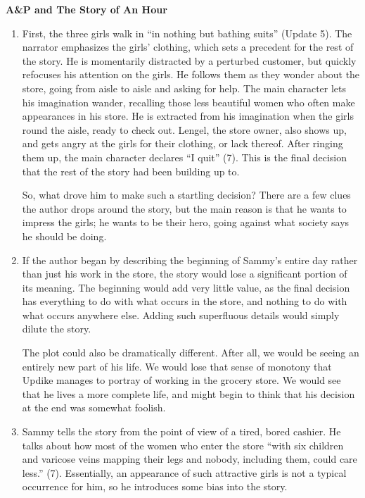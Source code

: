 \documentclass[12pt,letterpaper]{article}
\begin{document}
{\center\textbf{A\&P and The Story of An Hour} \\}

\begin{enumerate}

\item First, the three girls walk in ``in nothing but bathing suits'' (Update
5).  The narrator emphasizes the girls' clothing, which sets a precedent for the
rest of the story.  He is momentarily distracted by a perturbed customer, but
quickly refocuses his attention on the girls.  He follows them as they wonder
about the store, going from aisle to aisle and asking for help.  The main
character lets his imagination wander, recalling those less beautiful women who
often make appearances in his store.  He is extracted from his imagination when
the girls round the aisle, ready to check out.  Lengel, the store owner, also
shows up, and gets angry at the girls for their clothing, or lack thereof.
After ringing them up, the main character declares ``I quit'' (7).  This is the
final decision that the rest of the story had been building up to.

So, what drove him to make such a startling decision?  There are a few clues the
author drops around the story, but the main reason is that he wants to impress
the girls; he wants to be their hero, going against what society says he should
be doing.

\item If the author began by describing the beginning of Sammy's entire day
rather than just his work in the store, the story would lose a significant
portion of its meaning.  The beginning would add very little value, as the final
decision has everything to do with what occurs in the store, and nothing to do
with what occurs anywhere else.  Adding such superfluous details would simply
dilute the story.

The plot could also be dramatically different.  After all, we would be seeing an
entirely new part of his life.  We would lose that sense of monotony that Updike
manages to portray of working in the grocery store.  We would see that he lives
a more complete life, and might begin to think that his decision at the end was
somewhat foolish.

\item Sammy tells the story from the point of view of a tired, bored cashier.
He talks about how most of the women who enter the store ``with six children and
varicose veins mapping their legs and nobody, including them, could care less.''
(7).  Essentially, an appearance of such attractive girls is not a typical
occurrence for him, so he introduces some bias into the story.


\end{enumerate}
\end{document}
